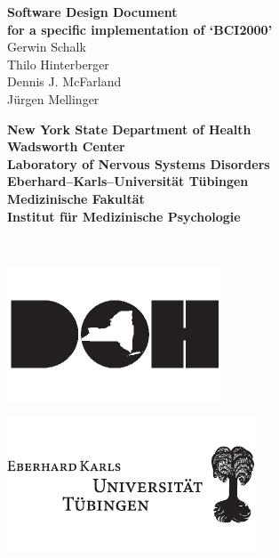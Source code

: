\begin{titlepage}
\hspace{-7mm}
\begin{minipage}{\textwidth}
\begin{center}
\vspace{.5cm}
{\huge \bf Software Design Document\\[1.5ex]}
{\large \bf for a specific implementation of `BCI2000'}
\\[1.5cm]
{\Large Gerwin Schalk\\}
{\Large Thilo Hinterberger\\}
{\Large Dennis J. McFarland\\}
{\Large J\"urgen Mellinger\\[1.5cm]}
%
\begin{minipage}{13cm}
  \begin{minipage}[c]{13cm}
    \begin{center}
      {\Large \bf New York State Department of Health\\[2ex]}
      {\large \bf Wadsworth Center\\[0.5ex]
       Laboratory of Nervous Systems Disorders\\[4ex]}
      {\Large \bf Eberhard--Karls--Universit\"at T\"ubingen\\[2ex]}
      {\large \bf Medizinische Fakult\"at\\[0.5ex]
       Institut f\"ur Medizinische Psychologie\\[0.5ex]}
    \end{center}
  \end{minipage}
  \\[1.0cm]
  \begin{minipage}[c]{6cm}
    \centerline{\includegraphics{figures/DOHlogo}}
  \end{minipage}
  \hspace{1.5cm}
  \begin{minipage}[c]{3cm}
    \centerline{\includegraphics{figures/EKUlogo}}

\end{minipage}
\end{minipage}
\end{center}
\end{minipage}
\end{titlepage}
